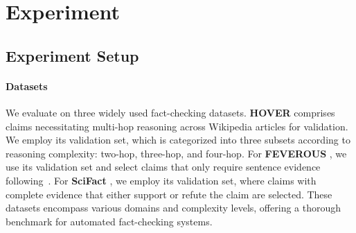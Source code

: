 






\section{Experiment}
\subsection{Experiment Setup}
\paragraph{Datasets} 
We evaluate {\MyFC} on three widely used fact-checking datasets. \textbf{HOVER} \cite{jiang2020hover} comprises claims necessitating multi-hop reasoning across Wikipedia articles for validation. We employ its validation set, which is categorized into three subsets according to reasoning complexity: two-hop, three-hop, and four-hop. For \textbf{FEVEROUS} \cite{aly2021feverous}, we use its validation set and select claims that only require sentence evidence following~\cite{pan2023fact}. For \textbf{SciFact} \cite{wadden2020fact}, we employ its validation set, where claims with complete evidence that either support or refute the claim are selected. 
These datasets encompass various domains and complexity levels, offering a thorough benchmark for automated fact-checking systems.
